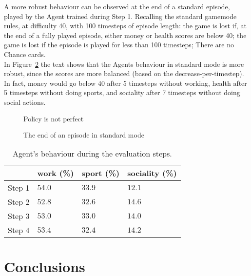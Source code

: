 \documentclass{article}
\begin{document}
A more robust behaviour can be observed at the end of a standard episode, played by the Agent trained during Step 1. Recalling the standard gamemode rules, at difficulty 40, with 100 timesteps of episode length: the game is lost if, at the end of a fully played episode, either money or health scores are below 40; the game is lost if the episode is played for less than 100 timesteps; There are no Chance cards.\\
In Figure~\ref{fig:D} the text shows that the Agents behaviour in standard mode is more robust, since the scores are more balanced (based on the decrease-per-timestep). In fact, money would go below 40 after 5 timesteps without working, health after 5 timesteps without doing sports, and sociality after 7 timesteps without doing social actions.

\begin{figure}
  \centering
  \caption{Policy is not perfect}
  \label{fig:C}
\end{figure} 

\begin{figure}
  \centering
  \caption{The end of an episode in standard mode}
  \label{fig:D}
\end{figure} 

\begin{table}
  \caption{Agent's behaviour during the evaluation steps.}
  \label{behaviour}
  \centering
  \begin{tabular}{llll}
    \toprule
    & work (\%) & sport (\%) & sociality (\%)           \\
    \midrule
    Step 1  & \(54.0\)  & \(33.9\)    & \(12.1\)        \\
    Step 2  & \(52.8\)  & \(32.6\)    & \(14.6\)        \\
    Step 3  & \(53.0\)  & \(33.0\)    & \(14.0\)        \\
    Step 4  & \(53.4\)  & \(32.4\)    & \(14.2\)        \\
    \bottomrule
  \end{tabular}
\end{table}

\section{Conclusions}
\end{document}
